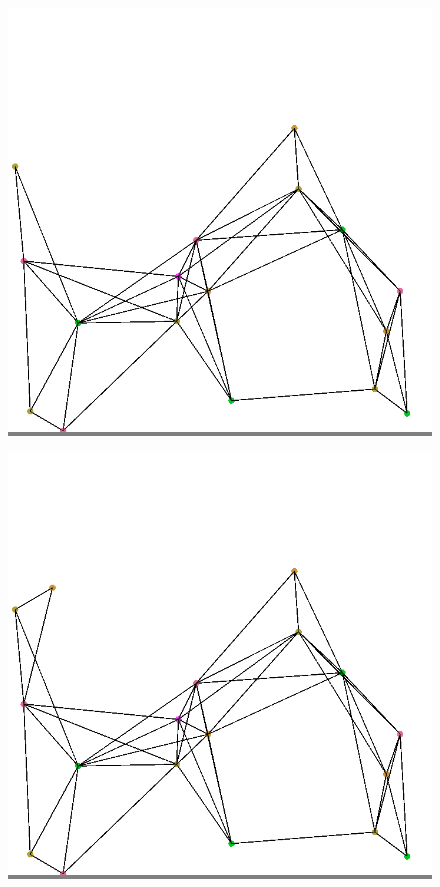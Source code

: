 \documentclass{article}
\begin{document}
\begin{figure}
\begin{minipage}{0.2\textwidth}
            \end{minipage}
            \vskip 0.1in
            \begin{minipage}{0.2\textwidth}
            \colorbox{gray}{\includegraphics[width=\linewidth]{./images/color-17.png}}
            \end{minipage}
            \hspace{\fill}
            \begin{minipage}{0.2\textwidth}
            \colorbox{gray}{\includegraphics[width=\linewidth]{./images/color-18.png}}

\end{minipage}
\end{figure}
\end{document}
